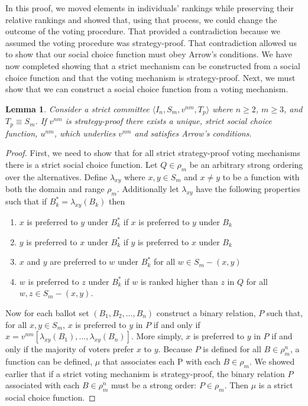 \documentclass{amsart}
\newtheorem{lemma}{Lemma}
\theoremstyle{plain}
\begin{document}
In this proof, we moved elements in individuals' rankings while preserving their relative rankings and showed that, using that process, we could change the outcome of the voting procedure. That provided a contradiction because we assumed the voting procedure was strategy-proof. That contradiction allowed us to show that our social choice function must obey Arrow's conditions. We have now completed showing that a strict mechanism can be constructed from a social choice function and that the voting mechanism is strategy-proof. Next, we must show that we can construct a social choice function from a voting mechanism.

\begin{lemma}
    Consider a strict committee $\langle I_n, S_m, v^{nm}, T_p \rangle$ where $n \ge 2$, $m \ge 3$, and $T_p \equiv S_m$. If $v^{nm}$ is strategy-proof there exists a unique, strict social choice function, $u^{nm}$, which underlies $v^{nm}$ and satisfies Arrow's conditions.
\end{lemma}
\begin{proof}
    First, we need to show that for all strict strategy-proof voting mechanisms there is a strict social choice function. Let $Q \in \rho_m$ be an arbitrary strong ordering over the alternatives. Define $\lambda_{xy}$ where $x,y \in S_m$ and $x \ne y$ to be a function with both the domain and range $\rho_m$. Additionally let $\lambda_{xy}$ have the following properties such that if $B^*_k = \lambda_{xy}(B_k)$ then

\vskip 0.25cm
    
\begin{enumerate}[a]
    \item $x$ is preferred to $y$ under $B^*_k$ if $x$ is preferred to $y$ under $B_k$
    \item $y$ is preferred to $x$ under $B^*_k$ if $y$ is preferred to $x$ under $B_k$
    \item $x$ and $y$ are preferred to $w$ under $B^*_k$ for all $w \in S_m - (x,y)$ 
    \item $w$ is preferred to $z$ under $B^*_k$ if $w$ is ranked higher than $z$ in $Q$ for all $w,z \in S_m - (x,y)$.
\end{enumerate}

\vskip 0.25cm

Now for each ballot set $(B_1, B_2, ... , B_n)$ construct a binary relation, $P$ such that, for all $x,y \in S_m$, $x$ is preferred to $y$ in $P$ if and only if $x = v^{nm}[\lambda_{xy}(B_1), ... , \lambda_{xy}(B_n)]$. More simply, $x$ is preferred to $y$ in $P$ if and only if the majority of voters prefer $x$ to $y$. Because $P$ is defined for all $B \in \rho_m^n$, a function can be defined, $\mu$ that associates each P with each $B \in \rho_m$. We showed earlier that if a strict voting mechanism is strategy-proof, the binary relation $P$ associated with each $B \in \rho_m^n$ must be a strong order: $P \in \rho_m$. Then $\mu$ is a strict social choice function.
\end{proof}
\end{document}

